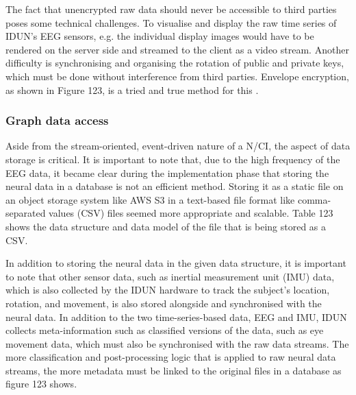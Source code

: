 
The fact that unencrypted raw data should never be accessible to third parties poses some technical challenges. To visualise and display the raw time series of IDUN's EEG sensors, e.g. the individual display images would have to be rendered on the server side and streamed to the client as a video stream. Another difficulty is synchronising and organising the rotation of public and private keys, which must be done without interference from third parties. Envelope encryption, as shown in Figure 123, is a tried and true method for this \citep{google_cloud_envelope_nodate}.


\subsubsection{Graph data access}
\label{chapter5-graph-data-access}

Aside from the stream-oriented, event-driven nature of a N/CI, the aspect of data storage is critical. It is important to note that, due to the high frequency of the EEG data, it became clear during the implementation phase that storing the neural data in a database is not an efficient method. Storing it as a static file on an object storage system like AWS S3 in a text-based file format like comma-separated values (CSV) files seemed more appropriate and scalable. Table 123 shows the data structure and data model of the file that is being stored as a CSV.


In addition to storing the neural data in the given data structure, it is important to note that other sensor data, such as inertial measurement unit (IMU) data, which is also collected by the IDUN hardware to track the subject's location, rotation, and movement, is also stored alongside and synchronised with the neural data. In addition to the two time-series-based data, EEG and IMU, IDUN collects meta-information such as classified versions of the data, such as eye movement data, which must also be synchronised with the raw data streams. The more classification and post-processing logic that is applied to raw neural data streams, the more metadata must be linked to the original files in a database as figure 123 shows.


